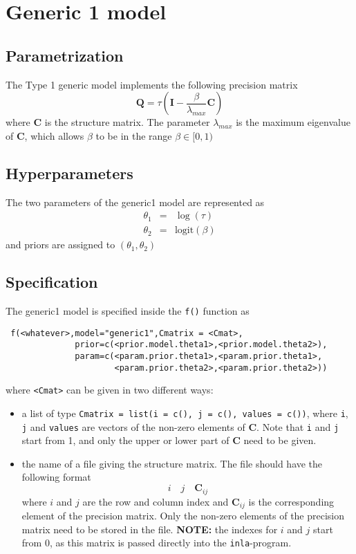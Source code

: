 \documentclass[a4paper,11pt]{article}
\begin{document}
\section*{Generic 1 model}

\subsection*{Parametrization}

The Type 1 generic model implements the following precision matrix
\[
\mathbf{Q}=\tau(\mathbf{I}-\frac{\beta}{\lambda_{max}}\mathbf{C})
\]
where $\mathbf{C}$ is the structure matrix. The parameter
$\lambda_{max}$ is the maximum eigenvalue of $\mathbf{C}$, which
allows $\beta$ to be in the range $\beta\in[0,1)$
\subsection*{Hyperparameters}

The two parameters of the generic1 model are represented as
\begin{eqnarray*}
    \theta_1 &= & \log(\tau)\\
    \theta_2 &=&\text{logit}(\beta)
\end{eqnarray*}
and priors are assigned to $(\theta_1,\theta_2)$

\subsection*{Specification}

The generic1 model is specified inside the {\tt f()} function as
\begin{verbatim}
 f(<whatever>,model="generic1",Cmatrix = <Cmat>,
              prior=c(<prior.model.theta1>,<prior.model.theta2>),
              param=c(<param.prior.theta1>,<param.prior.theta1>,
                      <param.prior.theta2>,<param.prior.theta2>))
\end{verbatim}
where {\tt <Cmat>} can be given in two different ways:
\begin{itemize}
\item a list of type {\tt Cmatrix = list(i = c(), j = c(), values =
        c())}, where {\tt i}, {\tt j} and {\tt values} are vectors of the
    non-zero elements of $\mathbf{C}$. Note that {\tt i} and {\tt j}
    start from 1, and only the upper or lower part of $\mathbf{C}$
    need to be given.
\item the name of a file giving the structure matrix. The file should
    have the following format
    \[
    i\quad j\quad \mathbf{C}_{ij}
    \]
    where $i$ and $j$ are the row and column index and
    $\mathbf{C}_{ij}$ is the corresponding element of the precision
    matrix. Only the non-zero elements of the precision matrix need to
    be stored in the file. {\bf NOTE:} the indexes for $i$ and $j$
    start from 0, as this matrix is passed directly into the
    \texttt{inla}-program.
\end{itemize}
\end{document}
